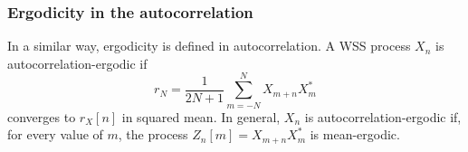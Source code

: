 \subsubsection{Ergodicity in the autocorrelation}

In a similar way, ergodicity is defined in autocorrelation. A WSS process $X_n$ is autocorrelation-ergodic if
\begin{equation}
\label{ec:autocorr_ergodic}
r_N = \frac{1}{2N+1}\sum_{m=-N}^{N} X_{m+n} X_m^*
\end{equation}
converges to $r_X[n]$ in squared mean. In general, $X_n$ is autocorrelation-ergodic if, for every value of $m$, the process $Z_n[m] = X_{m + n} X_m^*$ is mean-ergodic.





